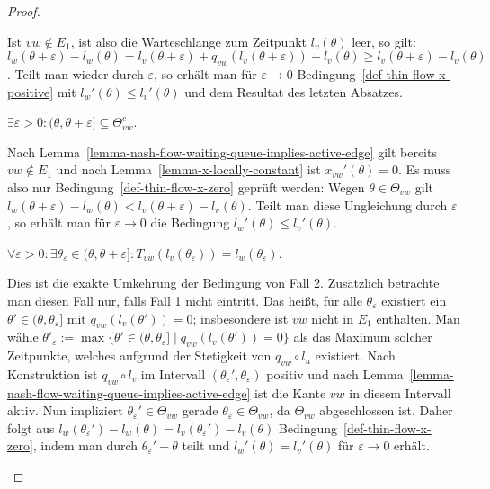 \begin{proof}
\begin{description}[leftmargin=0cm, topsep=0cm, itemindent=0.5cm]
		Ist $vw\notin E_1$, ist also die Warteschlange zum Zeitpunkt $l_v(\theta)$ leer, so gilt: $l_w(\theta+\varepsilon) - l_w(\theta) = l_v(\theta + \varepsilon) + q_{vw}(l_v(\theta + \varepsilon)) - l_v(\theta) \geq l_v(\theta + \varepsilon) - l_v(\theta)$.
		Teilt man wieder durch $\varepsilon$, so erhält man für $\varepsilon  \rightarrow 0$ Bedingung~\ref{def-thin-flow-x-positive} mit $l_w'(\theta) \leq l_v'(\theta)$ und dem Resultat des letzten Absatzes.
		
		\item[2. Fall:] $\exists \varepsilon > 0: (\theta, \theta + \varepsilon] \subseteq \Theta_{vw}^c$.
		
		Nach Lemma~\ref{lemma-nash-flow-waiting-queue-implies-active-edge} gilt bereits $vw\notin E_1$ und nach Lemma~\ref{lemma-x-locally-constant} ist $x_{vw}'(\theta) = 0$. 
		Es muss also nur Bedingung~\ref{def-thin-flow-x-zero} geprüft werden:
		Wegen $\theta\in\Theta_{vw}$ gilt $l_w(\theta + \varepsilon) - l_w(\theta) < l_v(\theta + \varepsilon) - l_v(\theta)$.
		Teilt man diese Ungleichung  durch $\varepsilon$, so erhält man für $\varepsilon\rightarrow 0$ die Bedingung $l_w'(\theta)\leq l_v'(\theta)$.
		
		\item[3. Fall:] $\forall \varepsilon>0: \exists \theta_{\varepsilon}\in (\theta, \theta+\varepsilon]: T_{vw}(l_v(\theta_\varepsilon)) = l_w(\theta_\varepsilon)$.
		
		Dies ist die exakte Umkehrung der Bedingung von Fall 2.
		Zusätzlich betrachte man diesen Fall nur, falls Fall 1 nicht eintritt.
		Das heißt, für alle $\theta_\varepsilon$ existiert ein $\theta'\in(\theta, \theta_\varepsilon]$ mit $q_{vw}(l_v(\theta')) = 0$; insbesondere ist $vw$ nicht in $E_1$ enthalten.
		Man wähle $\theta'_\varepsilon:=\max\{ \theta'\in (\theta, \theta_\varepsilon] \mid q_{vw}(l_v(\theta')) = 0 \}$ als das Maximum solcher Zeitpunkte, welches aufgrund der Stetigkeit von $q_{vw}\circ l_u$ existiert.
		Nach Konstruktion ist $q_{vw}\circ l_v$ im Intervall $(\theta_\varepsilon', \theta_\varepsilon)$ positiv und nach Lemma~\ref{lemma-nash-flow-waiting-queue-implies-active-edge} ist die Kante $vw$ in diesem Intervall aktiv.
		Nun impliziert $\theta_\varepsilon'\in \Theta_{vw}$ gerade $\theta_\varepsilon\in\Theta_{vw}$, da $\Theta_{vw}$ ab\-ge\-schlossen ist.
		Daher folgt aus $l_w(\theta_\varepsilon') - l_w(\theta) = l_v(\theta_\varepsilon') - l_v(\theta)$ 		Bedingung~\ref{def-thin-flow-x-zero}, indem man durch $\theta_\varepsilon'-\theta$ teilt und $l_w'(\theta) = l_v'(\theta)$ für $\varepsilon\rightarrow0$ erhält.
		

\end{description}
\end{proof}
